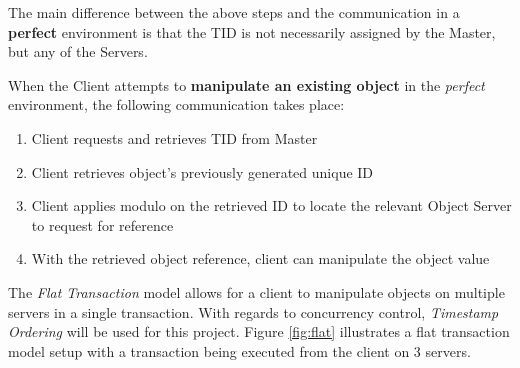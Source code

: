 \documentclass[times, 10pt,twocolumn]{article}
\begin{document}
The main difference between the above steps and the communication in a {\bf perfect} environment is that the TID is not necessarily assigned by the Master, but any of the Servers.

When the Client attempts to {\bf manipulate an existing object} in the {\it perfect} environment, the following communication takes place:
\begin{enumerate}
\item Client requests and retrieves TID from Master
\item Client retrieves object's previously generated unique ID
\item Client applies modulo on the retrieved ID to locate the relevant Object Server to request for reference
\item With the retrieved object reference, client can manipulate the object value
\end{enumerate}

\label{subsec:transmgt}
The {\it Flat Transaction} model allows for a client to manipulate objects on multiple servers in a single transaction. With regards to concurrency control, {\it Timestamp Ordering} will be used for this project. Figure \ref{fig:flat} illustrates a flat transaction model setup with a transaction being executed from the client on 3 servers.
\end{document}

